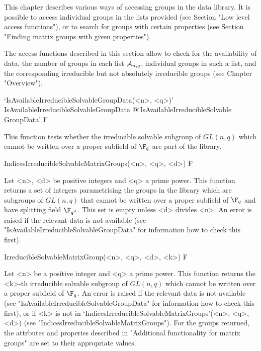 


This chapter describes various ways of accessing groups in the data library.
It is possible to access individual groups in the lists provided  (see
Section  "Low level access functions"), or to search for groups with certain
properties (see Section "Finding matrix groups with given properties"). 



The access functions described in this section allow
to check for the availability of data, the number of groups in each list
${\cal A}_{n,q}$, individual groups in such a 
list, and the corresponding irreducible but not absolutely irreducible 
groups  (see Chapter "Overview").

\>`IsAvailableIrreducibleSolvableGroupData(<n>, <q>)'%
{IsAvailableIrreducibleSolvableGroupData}%
@{`IsAvailableIrreducibleSolvable\\GroupData'} F

This function tests whether the irreducible solvable subgroup of $GL(n,q)$ which
cannot be written over a proper subfield of $\F_q$ are part of the {\IRREDSOL} library.


\>IndicesIrreducibleSolvableMatrixGroups(<n>, <q>, <d>) F

Let <n>, <d> be positive integers and <q> a prime power. This
function returns a set of integers parametrising the groups in the {\IRREDSOL} library
which are subgroups of $GL(n,q)$ that cannot be written over a proper subfield of $\F_q$
and have splitting field $\F_{q^d}$. This set is empty unless <d> divides <n>. An error is raised if the relevant
data is not available (see "IsAvailableIrreducibleSolvableGroupData" for information 
how to check this first).


\>IrreducibleSolvableMatrixGroup(<n>, <q>, <d>, <k>) F

Let <n> be a  positive integer and <q> a prime power. This
function returns the <k>-th irreducible solvable subgroup of $GL(n,q)$ which
cannot be written over a proper subfield of $\F_q$. 
An error is raised if the relevant
data is not available (see "IsAvailableIrreducibleSolvableGroupData" for information 
how to check this first), or if <k> is not in  
`IndicesIrreducibleSolvableMatrixGroups'(<n>, <q>, <d>) 
(see "IndicesIrreducibleSolvableMatrixGroups").
For the groups returned, the attrbutes and properies described in
"Additional functionality for matrix groups" are set to their appropriate values.


